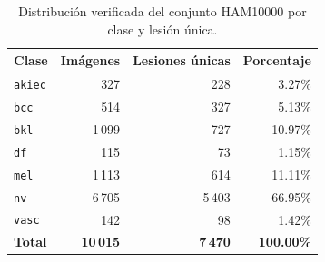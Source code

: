 \begin{table}[htbp]\centering\normalsize
\setlength{\tabcolsep}{8pt}
\caption{Distribución verificada del conjunto HAM10000 por clase y lesión única.}
\begin{tabularx}{0.92\textwidth}{>{\raggedright\arraybackslash}Xrrr}\toprule
\textbf{Clase} & \textbf{Imágenes} & \textbf{Lesiones únicas} & \textbf{Porcentaje} \\ \midrule
\texttt{akiec} & 327 & 228 & 3.27\% \\
\texttt{bcc} & 514 & 327 & 5.13\% \\
\texttt{bkl} & 1\,099 & 727 & 10.97\% \\
\texttt{df} & 115 & 73 & 1.15\% \\
\texttt{mel} & 1\,113 & 614 & 11.11\% \\
\texttt{nv} & 6\,705 & 5\,403 & 66.95\% \\
\texttt{vasc} & 142 & 98 & 1.42\% \\
\midrule
\textbf{Total} & \textbf{10\,015} & \textbf{7\,470} & \textbf{100.00\%} \\
\bottomrule\end{tabularx}\end{table}
